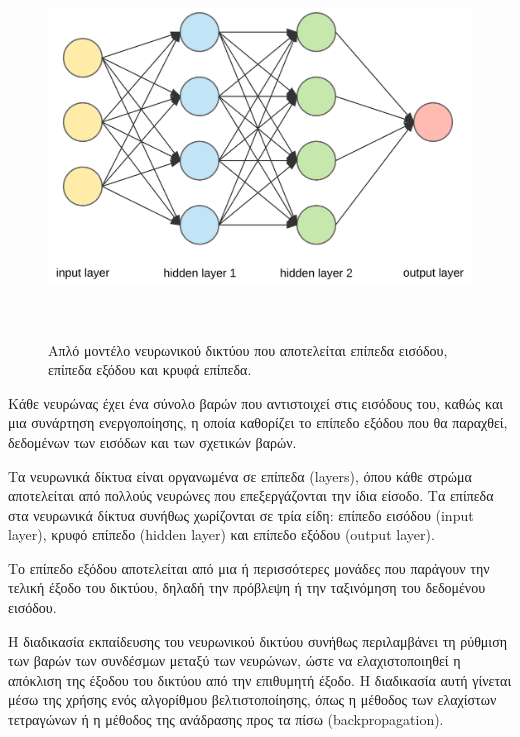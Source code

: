 {\begin{figure}[h!]
\centering
\includegraphics[width=\textwidth,height=10cm,keepaspectratio]{pictures/neural_network.png}
\caption{Απλό μοντέλο νευρωνικού δικτύου που αποτελείται επίπεδα εισόδου, επίπεδα εξόδου και κρυφά επίπεδα.}
\label{figure2.4}
\end{figure}

Κάθε νευρώνας έχει ένα σύνολο βαρών που αντιστοιχεί στις εισόδους του, καθώς και μια συνάρτηση ενεργοποίησης, η οποία καθορίζει το επίπεδο εξόδου που θα παραχθεί, δεδομένων των εισόδων και των σχετικών βαρών.

Τα νευρωνικά δίκτυα είναι οργανωμένα σε επίπεδα (layers), όπου κάθε στρώμα αποτελείται από πολλούς νευρώνες που επεξεργάζονται την ίδια είσοδο. Τα επίπεδα στα νευρωνικά δίκτυα συνήθως χωρίζονται σε τρία είδη: επίπεδο εισόδου (input layer), κρυφό επίπεδο (hidden layer) και επίπεδο εξόδου (output layer).

Το επίπεδο εξόδου αποτελείται από μια ή περισσότερες μονάδες που παράγουν την τελική έξοδο του δικτύου, δηλαδή την πρόβλεψη ή την ταξινόμηση του δεδομένου εισόδου.

Η διαδικασία εκπαίδευσης του νευρωνικού δικτύου συνήθως περιλαμβάνει τη ρύθμιση των βαρών των συνδέσμων μεταξύ των νευρώνων, ώστε να ελαχιστοποιηθεί η απόκλιση της έξοδου του δικτύου από την επιθυμητή έξοδο. Η διαδικασία αυτή γίνεται μέσω της χρήσης ενός αλγορίθμου βελτιστοποίησης, όπως η μέθοδος των ελαχίστων τετραγώνων ή η μέθοδος της ανάδρασης προς τα πίσω (backpropagation).

}

